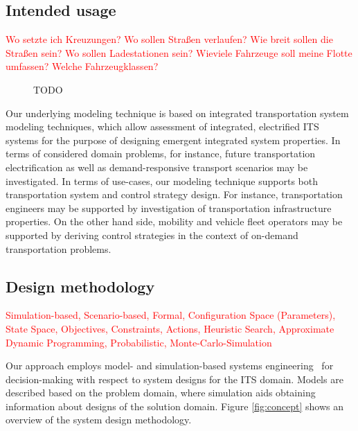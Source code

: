 \documentclass[a4paper,twoside]{article}
\begin{document}
	\subsection{Intended usage}
	\label{sec:scope}

	\textcolor{red}{Wo setzte ich Kreuzungen? Wo sollen Straßen verlaufen? Wie breit sollen die Straßen sein? Wo sollen Ladestationen sein? Wieviele Fahrzeuge soll meine Flotte umfassen? Welche Fahrzeugklassen?}

	\begin{figure}[!ht]
		\caption{TODO}
	\end{figure}
	
	Our underlying modeling technique is based on integrated transportation system modeling techniques, which allow assessment of integrated, electrified ITS systems for the purpose of designing emergent integrated system properties.
	In terms of considered domain problems, for instance, future transportation electrification as well as demand-responsive transport scenarios may be investigated.
	In terms of use-cases, our modeling technique supports both transportation system and control strategy design.
	For instance, transportation engineers may be supported by investigation of transportation infrastructure properties.
	On the other hand side, mobility and vehicle fleet operators may be supported by deriving control strategies in the context of on-demand transportation problems.
	
	
	\subsection{Design methodology}
	\label{sec:methodology}

	\textcolor{red}{Simulation-based, Scenario-based, Formal, Configuration Space (Parameters), State Space, Objectives, Constraints, Actions, Heuristic Search, Approximate Dynamic Programming, Probabilistic, Monte-Carlo-Simulation}
	
	Our approach employs model- and simulation-based systems engineering~\cite{gianni2014modeling} for decision-making with respect to system designs for the ITS domain.
	Models are described based on the problem domain, where simulation aids obtaining information about designs of the solution domain. Figure \ref{fig:concept} shows an overview of the system design methodology.
	
\end{document}
